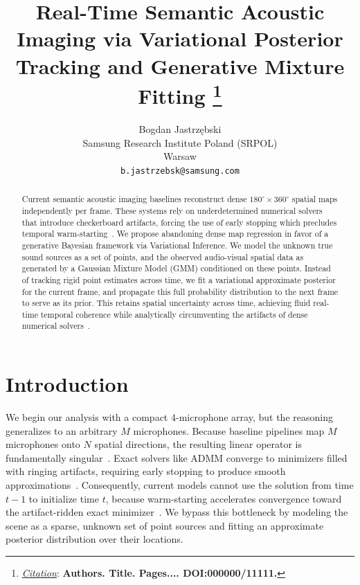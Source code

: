 \documentclass{article}
\title{Real-Time Semantic Acoustic Imaging via Variational Posterior Tracking and Generative Mixture Fitting
\thanks{\textit{\underline{Citation}}: 
\textbf{Authors. Title. Pages.... DOI:000000/11111.}} 
}
\author{
  Bogdan Jastrzębski \\
  Samsung Research Institute Poland (SRPOL) \\
  Warsaw \\
  \texttt{b.jastrzebsk@samsung.com} \\
}
\begin{document}
\maketitle


\begin{abstract}
Current semantic acoustic imaging baselines reconstruct dense $180^\circ \times 360^\circ$ spatial maps independently per frame. These systems rely on underdetermined numerical solvers that introduce checkerboard artifacts, forcing the use of early stopping which precludes temporal warm-starting~\cite{baseline2024}. We propose abandoning dense map regression in favor of a generative Bayesian framework via Variational Inference. We model the unknown true sound sources as a set of points, and the observed audio-visual spatial data as generated by a Gaussian Mixture Model (GMM) conditioned on these points. Instead of tracking rigid point estimates across time, we fit a variational approximate posterior for the current frame, and propagate this full probability distribution to the next frame to serve as its prior. This retains spatial uncertainty across time, achieving fluid real-time temporal coherence while analytically circumventing the artifacts of dense numerical solvers~\cite{baseline2024}.
\end{abstract}




\section{Introduction}
We begin our analysis with a compact 4-microphone array, but the reasoning generalizes to an arbitrary $M$ microphones. Because baseline pipelines map $M$ microphones onto $N$ spatial directions, the resulting linear operator is fundamentally singular~\cite{baseline2024}. Exact solvers like ADMM converge to minimizers filled with ringing artifacts, requiring early stopping to produce smooth approximations~\cite{baseline2024}. Consequently, current models cannot use the solution from time $t-1$ to initialize time $t$, because warm-starting accelerates convergence toward the artifact-ridden exact minimizer~\cite{baseline2024}. We bypass this bottleneck by modeling the scene as a sparse, unknown set of point sources and fitting an approximate posterior distribution over their locations.
\end{document}
